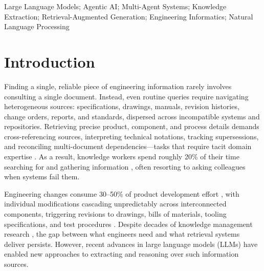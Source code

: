 \documentclass[largeformat]{interact}
\begin{document}
\begin{keywords}
Large Language Models; Agentic AI; Multi-Agent Systems; Knowledge Extraction; Retrieval-Augmented Generation; Engineering Informatics; Natural Language Processing 
\end{keywords}

\section{Introduction}
\label{sec:Introduction}
Finding a single, reliable piece of engineering information rarely involves consulting a single document. Instead, even routine queries require navigating heterogeneous sources:
specifications, drawings, manuals, revision histories, change orders, reports, and standards, dispersed across incompatible systems and repositories. Retrieving precise product, component,
and process details demands cross-referencing sources, interpreting technical notations, tracking supersessions, and reconciling multi-document dependencies—tasks that require tacit domain expertise \cite{hertzum2000information}. As a result, knowledge workers spend roughly 20\% of their time searching for and gathering information \cite{court1997supporting, mckinsey2012social}, often resorting to asking colleagues when systems fail them.

Engineering changes consume 30–50\% of product development effort \cite{fricke2000coping}, with individual modifications cascading unpredictably across interconnected components, triggering revisions to drawings, bills of materials, tooling specifications, and test procedures \cite{clarkson2004predicting}. Despite decades of knowledge management research \cite{mcmahon2004knowledge, heisig2010exploring}, the gap between what engineers need and what retrieval systems deliver persists. However, recent advances in large language models (LLMs) have enabled new approaches to extracting and reasoning over such information sources.
\end{document}
